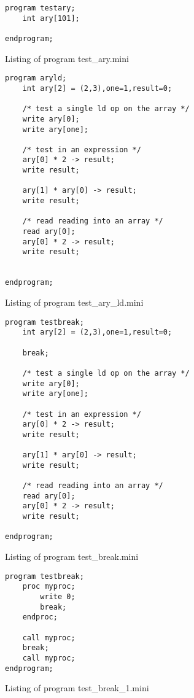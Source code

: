 \begin{program}
\begin{verbatim}
program testary;
	int ary[101];

endprogram;
\end{verbatim}
\caption{Listing of program test\_ary.mini}
\end{program}

\begin{program}
\begin{verbatim}
program aryld;
	int ary[2] = (2,3),one=1,result=0;

	/* test a single ld op on the array */
	write ary[0];
	write ary[one];

	/* test in an expression */
	ary[0] * 2 -> result;
	write result;

	ary[1] * ary[0] -> result;
	write result;

	/* read reading into an array */
	read ary[0];
	ary[0] * 2 -> result;
	write result;


endprogram;\end{verbatim}
\caption{Listing of program test\_ary\_ld.mini}
\end{program}

\begin{program}
\begin{verbatim}
program testbreak;
	int ary[2] = (2,3),one=1,result=0;

	break;

	/* test a single ld op on the array */
	write ary[0];
	write ary[one];

	/* test in an expression */
	ary[0] * 2 -> result;
	write result;

	ary[1] * ary[0] -> result;
	write result;

	/* read reading into an array */
	read ary[0];
	ary[0] * 2 -> result;
	write result;

endprogram;\end{verbatim}
\caption{Listing of program test\_break.mini}
\end{program}

\begin{program}
\begin{verbatim}
program testbreak;
	proc myproc;
		write 0;
		break;
	endproc;

	call myproc;
	break;
	call myproc;
endprogram;\end{verbatim}
\caption{Listing of program test\_break\_1.mini}
\end{program}

